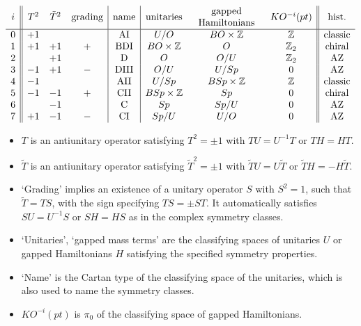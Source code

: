 \documentclass[12pt]{article}
\numberwithin{equation}{section}
\numberwithin{figure}{section}
\theoremstyle{remark}
\renewenvironment{table}[1][]{
  \begin{originaltable}[#1]
    \begin{mdframed}[linecolor=black!0,backgroundcolor=black!1]
}{
    \end{mdframed}
  \end{originaltable}
}
\def\bZ{\mathbb{Z}}
\begin{document}
\begin{table}
\[
\begin{array}{c||ccc|c|ccc||c}
i & T^2 & \tilde T^2 & \text{grading}& \text{name} & \text{unitaries} & \begin{tabular}{c} gapped \\ Hamiltonians\end{tabular} & KO^{-i}(pt)& \text{hist.}\\
\hline
0& +1&&&\text{AI} & U/O  & BO \times \bZ& \bZ & \text{classic}\\
1& +1&+1&+&\text{BDI} & BO\times \bZ & O  &\bZ_2& \text{chiral}\\
2& &+1&&\text{D} & O & O/U &\bZ_2 &\text{AZ}\\
3& -1&+1&-&\text{DIII}& O/U &U/Sp &0&\text{AZ}\\
4& -1&&&\text{AII}&U/Sp & BSp\times \bZ & \bZ& \text{classic}\\
5& -1&-1&+&\text{CII}& BSp\times\bZ & Sp  & 0& \text{chiral}\\
6& &-1&&\text{C}&Sp & Sp/U  &0 &\text{AZ}\\
7& +1&-1&-&\text{CI} &Sp/U & U/O &0&\text{AZ}\\
\end{array}
\]
\medskip
\begin{itemize}
\item $T$ is an antiunitary operator satisfying $T^2=\pm1$ with $TU=U^{-1}T$ or $TH=HT$.
\item $\tilde T$ is an antiunitary operator satisfying $\tilde T^2=\pm1$ with $\tilde TU=U\tilde T$ or $\tilde TH=-H\tilde T$.
\item `Grading' implies an existence of a unitary operator $S$ with $S^2=1$, 
such that $\tilde T= TS$, with the sign specifying $TS=\pm ST$.
It automatically satisfies $SU=U^{-1}S$ or $SH=HS$ as in the complex symmetry classes.
\item  `Unitaries', `gapped mass terms' are the classifying spaces of unitaries $U$ or gapped Hamiltonians $H$
satisfying the specified symmetry properties.
\item `Name' is the Cartan type of the classifying space of the unitaries,
which is also used to name the symmetry classes.
\item $KO^{-i}(pt)$ is $\pi_0$ of the classifying space of gapped Hamiltonians.
\end{itemize}
\caption{Symmetry classes: eight real ones.\label{tab:real-classes}}
\end{table}
\end{document}
